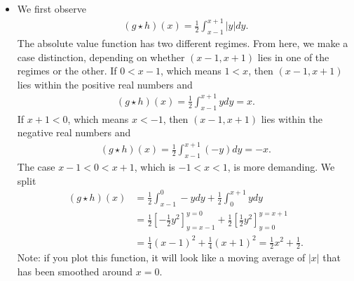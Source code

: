 \documentclass[11pt]{article}
\begin{document}
\begin{solution}
\begin{itemize}
        \item 
        We first observe 
        \begin{align*}
            ( g \star h )(x) = \frac 1 2 \int_{x-1}^{x+1} |y| dy.
        \end{align*}
        The absolute value function has two different regimes.
        From here, we make a case distinction, depending on whether $(x-1,x+1)$ lies in one of the regimes or the other. 
        If $0 < x-1$, which means $1 < x$, then $(x-1,x+1)$ lies within the positive real numbers and 
        \begin{align*}
            ( g \star h )(x) =   \frac 1 2 \int_{x-1}^{x+1}    y dy =  x.
        \end{align*}
        If $x+1 < 0$, which means $x < -1$, then $(x-1,x+1)$ lies within the negative real numbers and 
        \begin{align*}
            ( g \star h )(x) =   \frac 1 2 \int_{x-1}^{x+1} (-y) dy = -x.
        \end{align*}
        The case $x-1 < 0 < x+1$, which is $-1 < x < 1$, is more demanding. We split 
        \begin{align*}
            ( g \star h )(x) 
            &= 
            \frac 1 2 \int_{x-1}^{  0} -y dy
            +
            \frac 1 2 \int_{  0}^{x+1}  y dy
            \\&
            =
            \frac 1 2 \left[ -\frac 1 2 y^{2}\right]_{y=x-1}^{y=  0}
            +
            \frac 1 2 \left[  \frac 1 2 y^{2}\right]_{y=  0}^{y=x+1}
            \\&
            =
            \frac 1 4 (x-1)^{2} 
            +
            \frac 1 4 (x+1)^{2} 
            =
            \frac 1 2 x^2 + \frac 1 2
            .
        \end{align*}
        Note: if you plot this function, it will look like a moving average of $|x|$ that has been smoothed around $x=0$.
    \end{itemize}
\end{solution}
\end{document}
